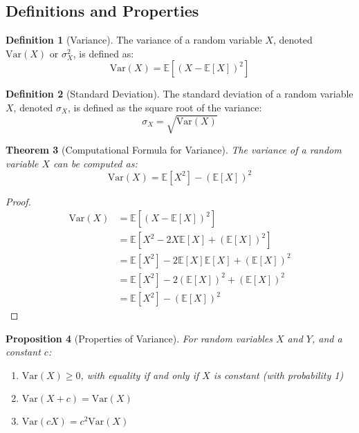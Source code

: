 \documentclass[12pt,a4paper]{article}
\theoremstyle{plain}
\newtheorem{theorem}{Theorem}[section]
\newtheorem{proposition}[theorem]{Proposition}
\theoremstyle{definition}
\newtheorem{definition}[theorem]{Definition}
\begin{document}
\subsection{Definitions and Properties}

\begin{definition}[Variance]
The variance of a random variable $X$, denoted $\text{Var}(X)$ or $\sigma^2_X$, is defined as:
\begin{equation}
\text{Var}(X) = \mathbb{E}[(X - \mathbb{E}[X])^2]
\end{equation}
\end{definition}

\begin{definition}[Standard Deviation]
The standard deviation of a random variable $X$, denoted $\sigma_X$, is defined as the square root of the variance:
\begin{equation}
\sigma_X = \sqrt{\text{Var}(X)}
\end{equation}
\end{definition}

\begin{theorem}[Computational Formula for Variance]
The variance of a random variable $X$ can be computed as:
\begin{equation}
\text{Var}(X) = \mathbb{E}[X^2] - (\mathbb{E}[X])^2
\end{equation}
\end{theorem}

\begin{proof}
\begin{align*}
\text{Var}(X) &= \mathbb{E}[(X - \mathbb{E}[X])^2]\\
&= \mathbb{E}[X^2 - 2X\mathbb{E}[X] + (\mathbb{E}[X])^2]\\
&= \mathbb{E}[X^2] - 2\mathbb{E}[X]\mathbb{E}[X] + (\mathbb{E}[X])^2\\
&= \mathbb{E}[X^2] - 2(\mathbb{E}[X])^2 + (\mathbb{E}[X])^2\\
&= \mathbb{E}[X^2] - (\mathbb{E}[X])^2
\end{align*}
\end{proof}

\begin{proposition}[Properties of Variance]
For random variables $X$ and $Y$, and a constant $c$:
\begin{enumerate}[label=(\roman*)]
\item $\text{Var}(X) \geq 0$, with equality if and only if $X$ is constant (with probability 1)
\item $\text{Var}(X + c) = \text{Var}(X)$
\item $\text{Var}(cX) = c^2 \text{Var}(X)$
\end{enumerate}
\end{proposition}
\end{document}
